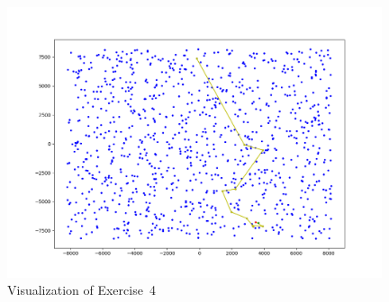 \documentclass[english, fontsize=12pt, paper=a4, twoside=false, draft=true, pagesize=auto, version=last, DIV=16]{scrartcl}
\theoremstyle{break}
\begin{document}
\begin{figure}[hptb]
  \centering
  \includegraphics[width=0.98\textwidth]{images/task4.png}
  \caption{Visualization of Exercise~4}
  \label{fig:task4}
\end{figure}
\end{document}
